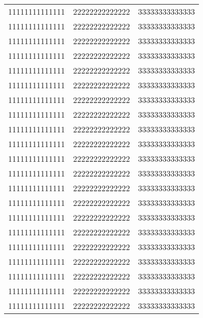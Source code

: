 \documentclass{article}
\begin{document}
\begin{center}
\begin{longtable}{|l|l|l|}
11111111111111 & 22222222222222 & 33333333333333 \\
11111111111111 & 22222222222222 & 33333333333333 \\
11111111111111 & 22222222222222 & 33333333333333 \\
11111111111111 & 22222222222222 & 33333333333333 \\
11111111111111 & 22222222222222 & 33333333333333 \\
11111111111111 & 22222222222222 & 33333333333333 \\
11111111111111 & 22222222222222 & 33333333333333 \\
11111111111111 & 22222222222222 & 33333333333333 \\
11111111111111 & 22222222222222 & 33333333333333 \\
11111111111111 & 22222222222222 & 33333333333333 \\
11111111111111 & 22222222222222 & 33333333333333 \\
11111111111111 & 22222222222222 & 33333333333333 \\
11111111111111 & 22222222222222 & 33333333333333 \\
11111111111111 & 22222222222222 & 33333333333333 \\
11111111111111 & 22222222222222 & 33333333333333 \\
11111111111111 & 22222222222222 & 33333333333333 \\
11111111111111 & 22222222222222 & 33333333333333 \\
11111111111111 & 22222222222222 & 33333333333333 \\
11111111111111 & 22222222222222 & 33333333333333 \\
11111111111111 & 22222222222222 & 33333333333333 \\
11111111111111 & 22222222222222 & 33333333333333 \\

\end{longtable}
\end{center}

\lipsum[2]
\end{document}

